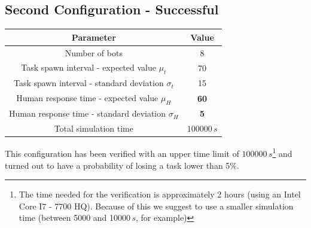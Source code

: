 \documentclass{article}
\begin{document}
		\subsection{Second Configuration - Successful} %
			\label{sub:sim2}
			\begin{center}
				\begin{tabular}{ |c|c|}
					\hline
					Parameter & Value\\
					\hline
					\hline
					Number of bots & 8 \\
					\hline
					Task spawn interval - expected value $\mu_t$ & 70\\
					\hline					
					Task spawn interval - standard deviation $\sigma_t$ & 15\\
					\hline
					Human response time - expected value $\mu_H$ & \textbf{60}\footnotemark\\
					\hline					
					Human response time - standard deviation $\sigma_H$ & \textbf{5}\\
					\hline
					Total simulation time & $100000\,s$ \\
					\hline
				\end{tabular}
			\end{center}
			This configuration has been verified with an upper time limit of $100000\,s$\footnote{The time needed for the verification is approximately 2 hours (using an Intel Core I7 - 7700 HQ). Because of this we suggest to use a smaller simulation time (between 5000 and 10000$\,s$, for example)}	 and turned out to have a probability of losing a task lower than 5\%.
			
			
			
\end{document}
